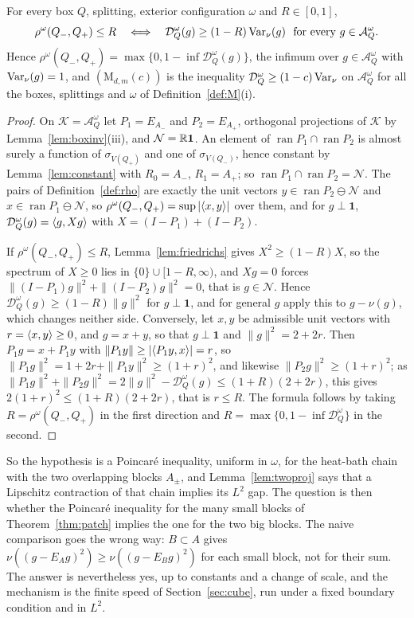 \begin{proposition}\label{prop:twoslab}
For every box $Q$, splitting, exterior configuration $\omega$ and
$R\in[0,1]$,
\[
\rho^\omega(Q_-,Q_+)\le R\quad\Longleftrightarrow\quad\mathcal D^\omega_Q(g)
\ge(1-R)\operatorname{Var}_\nu(g)\ \text{ for every }g\in\mathcal A^\omega_Q .
\]
Hence $\rho^\omega(Q_-,Q_+)=\max\{0,1-\inf\mathcal D^\omega_Q(g)\}$, the
infimum over $g\in\mathcal A^\omega_Q$ with $\operatorname{Var}_\nu(g)=1$, and
$(\mathrm M_{d,m}(c))$ is the inequality $\mathcal D^\omega_Q\ge(1-c)\operatorname{Var}_\nu$
on $\mathcal A^\omega_Q$ for all the boxes, splittings and $\omega$ of
Definition~\ref{def:M}\textup{(i)}.
\end{proposition}

\begin{proof}
On $\mathcal K=\mathcal A^\omega_Q$ let $P_1=E_{A_-}$ and $P_2=E_{A_+}$,
orthogonal projections of $\mathcal K$ by Lemma~\ref{lem:boxinv}(iii), and
$\mathcal N=\mathbb{R}\mathbf1$. An element of $\operatorname{ran}P_1\cap
\operatorname{ran}P_2$ is almost surely a function of $\sigma_{V(Q_+)}$ and
one of $\sigma_{V(Q_-)}$, hence constant by Lemma~\ref{lem:constant} with
$R_0=A_-$, $R_1=A_+$; so $\operatorname{ran}P_1\cap\operatorname{ran}P_2=
\mathcal N$. The pairs of Definition~\ref{def:rho} are exactly the unit
vectors $y\in\operatorname{ran}P_2\ominus\mathcal N$ and $x\in
\operatorname{ran}P_1\ominus\mathcal N$, so $\rho^\omega(Q_-,Q_+)=\sup|\langle x,y\rangle|$
over them, and for $g\perp\mathbf1$, $\mathcal D^\omega_Q(g)=\langle g,Xg\rangle$ with
$X=(I-P_1)+(I-P_2)$.

If $\rho^\omega(Q_-,Q_+)\le R$, Lemma~\ref{lem:friedrichs} gives $X^2\ge(1-R)X$,
so the spectrum of $X\ge0$ lies in $\{0\}\cup[1-R,\infty)$, and $Xg=0$ forces
$\|(I-P_1)g\|^2+\|(I-P_2)g\|^2=0$, that is $g\in\mathcal N$. Hence
$\mathcal D^\omega_Q(g)\ge(1-R)\|g\|^2$ for $g\perp\mathbf1$, and for general
$g$ apply this to $g-\nu(g)$, which changes neither side. Conversely, let
$x,y$ be admissible unit vectors with $r=\langle x,y\rangle\ge0$, and $g=x+y$, so that
$g\perp\mathbf1$ and $\|g\|^2=2+2r$. Then $P_1g=x+P_1y$ with $\|P_1y\|\ge
|\langle P_1y,x\rangle|=r$, so $\|P_1g\|^2=1+2r+\|P_1y\|^2\ge(1+r)^2$, and likewise
$\|P_2g\|^2\ge(1+r)^2$; as $\|P_1g\|^2+\|P_2g\|^2=2\|g\|^2-\mathcal D^\omega_Q
(g)\le(1+R)(2+2r)$, this gives $2(1+r)^2\le(1+R)(2+2r)$, that is $r\le R$.
The formula follows by taking $R=\rho^\omega(Q_-,Q_+)$ in the first direction
and $R=\max\{0,1-\inf\mathcal D^\omega_Q\}$ in the second.
\end{proof}

So the hypothesis is a Poincar\'e inequality, uniform in $\omega$, for the
heat-bath chain with the two overlapping blocks $A_\pm$, and
Lemma~\ref{lem:twoproj} says that a Lipschitz contraction of that chain
implies its $L^2$ gap. The question is then whether the Poincar\'e
inequality for the many small blocks of Theorem~\ref{thm:patch} implies the
one for the two big blocks. The naive comparison goes the wrong way: $B\subset
A$ gives $\nu((g-E_Ag)^2)\ge\nu((g-E_Bg)^2)$ for each small block, not for
their sum. The answer is nevertheless yes, up to constants and a change of
scale, and the mechanism is the finite speed of Section~\ref{sec:cube}, run
under a fixed boundary condition and in $L^2$.

